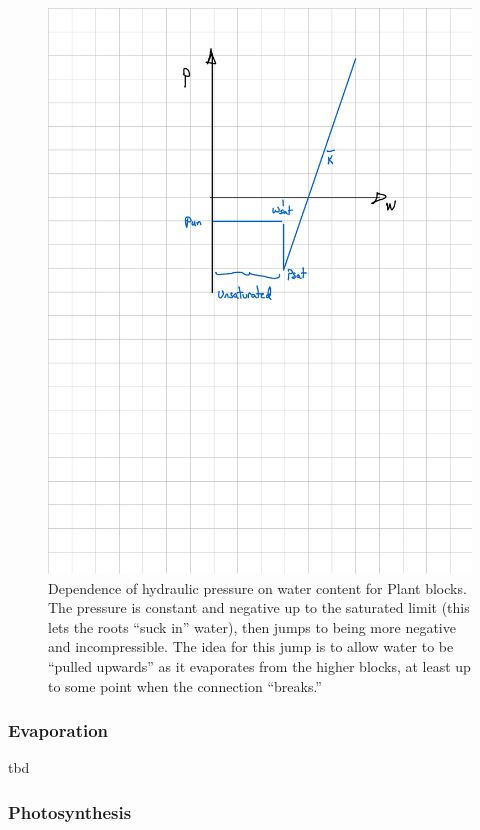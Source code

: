 \documentclass[10pt, a4paper, twocolumn]{article}
\begin{document}
\begin{figure}[ht]
  \centering
  \includegraphics{fig-plant-pressure.pdf}
  \caption{Dependence of hydraulic pressure on water content for Plant
    blocks. The pressure is constant and negative up to the saturated
    limit (this lets the roots ``suck in'' water), then jumps to being
    more negative and incompressible. The idea for this jump is to
    allow water to be ``pulled upwards'' as it evaporates from the
    higher blocks, at least up to some point when the connection
    ``breaks.''}
  \label{fig:plant-pressure}
\end{figure}

  
\subsubsection{Evaporation}

tbd

\subsubsection{Photosynthesis}
\end{document}
